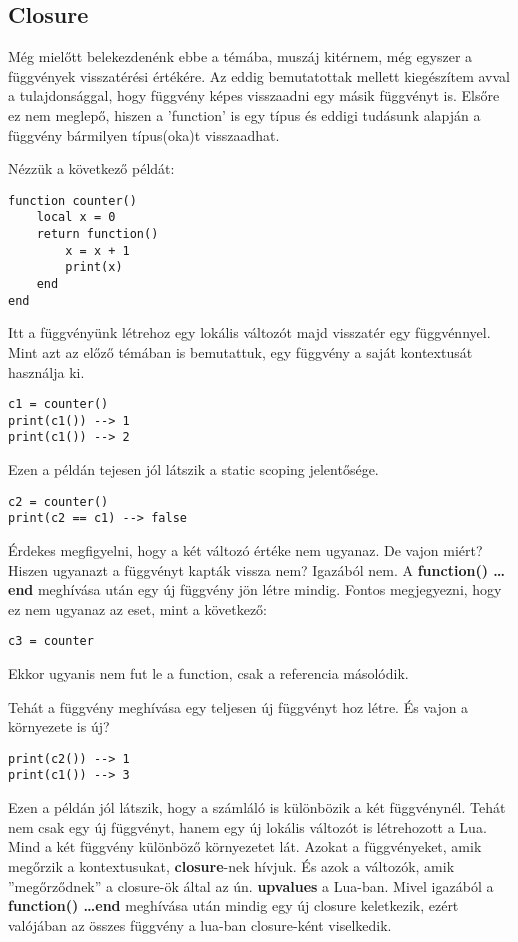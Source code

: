 \subsection{Closure}
\label{subsec:l_closure}

Még mielőtt belekezdenénk ebbe a témába, muszáj kitérnem, még egyszer a függvények visszatérési értékére. Az eddig bemutatottak mellett kiegészítem avval a tulajdonsággal, hogy függvény képes visszaadni egy másik függvényt is. Elsőre ez nem meglepő, hiszen a 'function' is egy típus és eddigi tudásunk alapján a függvény bármilyen típus(oka)t visszaadhat. 

Nézzük a következő példát:
\scriptsize
\begin{lstlisting}
function counter()
	local x = 0
	return function()
		x = x + 1
		print(x)
	end
end
\end{lstlisting}
\normalsize  
Itt a függvényünk létrehoz egy lokális változót majd visszatér egy függvénnyel. Mint azt az előző témában is bemutattuk, egy függvény a saját kontextusát használja ki.
\scriptsize
\begin{lstlisting}
c1 = counter()
print(c1()) --> 1
print(c1()) --> 2
\end{lstlisting}
\normalsize
Ezen a példán tejesen jól látszik a static scoping jelentősége. 
\scriptsize
\begin{lstlisting}
c2 = counter()
print(c2 == c1) --> false 
\end{lstlisting}
\normalsize
Érdekes megfigyelni, hogy a két változó értéke nem ugyanaz. De vajon miért? Hiszen ugyanazt a függvényt kapták vissza nem? Igazából nem. A \textbf{function() \dots end} meghívása után egy új függvény jön létre mindig. Fontos megjegyezni, hogy ez nem ugyanaz az eset, mint a következő:
\scriptsize
\begin{lstlisting}
c3 = counter
\end{lstlisting}
\normalsize
Ekkor ugyanis nem fut le a function, csak a referencia másolódik. 

Tehát a függvény meghívása egy teljesen új függvényt hoz létre. És vajon a környezete is új? 
\scriptsize
\begin{lstlisting}
print(c2()) --> 1
print(c1()) --> 3
\end{lstlisting}
\normalsize
Ezen a példán jól látszik, hogy a számláló is különbözik a két függvénynél. Tehát nem csak egy új függvényt, hanem egy új lokális változót is létrehozott a Lua. Mind a két függvény különböző környezetet lát. Azokat a függvényeket, amik megőrzik a kontextusukat, \textbf{closure}-nek hívjuk. És azok a változók, amik ''megőrződnek'' a closure-ök által az ún. \textbf{upvalues} a Lua-ban. Mivel igazából a \textbf{function() \dots end} meghívása után mindig egy új closure keletkezik, ezért valójában az összes függvény a lua-ban closure-ként viselkedik.

